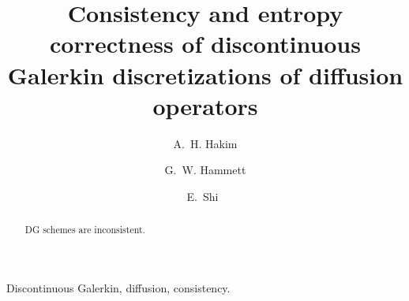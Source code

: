 \documentclass{siamltex}
\title{Consistency and entropy correctness of discontinuous Galerkin
  discretizations of diffusion operators}
\author{A.~H. Hakim\footnotemark[2] \and G.~W. Hammett\footnotemark[2]
  \and E.~Shi\footnotemark[2]\ \footnotemark[3]}
\begin{document}
\maketitle

\begin{abstract}
  DG schemes are inconsistent.
\end{abstract}

\begin{keywords} 
Discontinuous Galerkin, diffusion, consistency.
\end{keywords}
\end{document}
